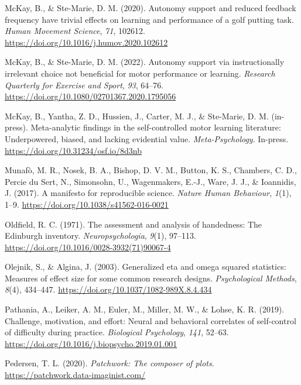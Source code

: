 \documentclass[
  doc, donotrepeattitle,floatsintext]{apa7}
\newlength{\cslhangindent}
\newlength{\cslentryspacingunit} %
\newenvironment{CSLReferences}[2] %
 {%
  \setlength{\parindent}{0pt}
  \ifodd #1
  \let\oldpar\par
  \def\par{\hangindent=\cslhangindent\oldpar}
  \fi
  \setlength{\parskip}{#2\cslentryspacingunit}
 }%
 {}
\begin{document}
\begin{CSLReferences}{1}{0}
\leavevmode{}%
McKay, B., \& Ste-Marie, D. M. (2020). Autonomy support and reduced feedback frequency have trivial effects on learning and performance of a golf putting task. \emph{Human Movement Science}, \emph{71}, 102612. \url{https://doi.org/10.1016/j.humov.2020.102612}

\leavevmode{}%
McKay, B., \& Ste-Marie, D. M. (2022). Autonomy support via instructionally irrelevant choice not beneficial for motor performance or learning. \emph{Research Quarterly for Exercise and Sport}, \emph{93}, 64--76. \url{https://doi.org/10.1080/02701367.2020.1795056}

\leavevmode{}%
McKay, B., Yantha, Z. D., Hussien, J., Carter, M. J., \& Ste-Marie, D. M. (in-press). Meta-analytic findings in the self-controlled motor learning literature: {Underpowered}, biased, and lacking evidential value. \emph{Meta-Psychology}. In-press. \url{https://doi.org/10.31234/osf.io/8d3nb}

\leavevmode{}%
Munafò, M. R., Nosek, B. A., Bishop, D. V. M., Button, K. S., Chambers, C. D., Percie du Sert, N., Simonsohn, U., Wagenmakers, E.-J., Ware, J. J., \& Ioannidis, J. (2017). A manifesto for reproducible science. \emph{Nature Human Behaviour}, \emph{1}(1), 1--9. \url{https://doi.org/10.1038/s41562-016-0021}

\leavevmode{}%
Oldfield, R. C. (1971). The assessment and analysis of handedness: The {Edinburgh} inventory. \emph{Neuropsychologia}, \emph{9}(1), 97--113. \url{https://doi.org/10.1016/0028-3932(71)90067-4}

\leavevmode{}%
Olejnik, S., \& Algina, J. (2003). Generalized eta and omega squared statistics: Measures of effect size for some common research designs. \emph{Psychological Methods}, \emph{8}(4), 434--447. \url{https://doi.org/10.1037/1082-989X.8.4.434}

\leavevmode{}%
Pathania, A., Leiker, A. M., Euler, M., Miller, M. W., \& Lohse, K. R. (2019). Challenge, motivation, and effort: {Neural} and behavioral correlates of self-control of difficulty during practice. \emph{Biological Psychology}, \emph{141}, 52--63. \url{https://doi.org/10.1016/j.biopsycho.2019.01.001}

\leavevmode{}%
Pedersen, T. L. (2020). \emph{Patchwork: The composer of plots}. \url{https://patchwork.data-imaginist.com/}


\end{CSLReferences}
\end{document}
